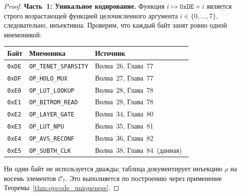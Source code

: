 \begin{proof}

\medskip
\noindent\textbf{Часть~1: Уникальное кодирование.}
Функция $i \mapsto \mathtt{0xDE} + i$ является строго возрастающей
функцией целочисленного аргумента $i \in \{0, \ldots, 7\}$,
следовательно, инъективна.  Проверим, что каждый байт занят
ровно одной мнемоникой:

\begin{center}
\begin{tabular}{lll}
\hline
Байт & Мнемоника & Источник \\
\hline
\texttt{0xDE} & \texttt{OP\_TENET\_SPARSITY}  & Волна~26, Глава~77 \\
\texttt{0xDF} & \texttt{OP\_HOLO\_MUX}         & Волна~27, Глава~77 \\
\texttt{0xE0} & \texttt{OP\_LUT\_LOOKUP}        & Волна~28, Глава~78 \\
\texttt{0xE1} & \texttt{OP\_BITROM\_READ}       & Волна~28, Глава~78 \\
\texttt{0xE2} & \texttt{OP\_LAYER\_GATE}        & Волна~34, Глава~80 \\
\texttt{0xE3} & \texttt{OP\_LUT\_NPU}           & Волна~35, Глава~81 \\
\texttt{0xE4} & \texttt{OP\_AVS\_RECONF}        & Волна~36, Глава~82~\cite{pr655_t27} \\
\texttt{0xE5} & \texttt{OP\_SUBTH\_CLK}         & Волна~38, Глава~84~(данная)~\cite{pr661_t27} \\
\hline
\end{tabular}
\end{center}

Ни один байт не используется дважды; таблица документирует
инъекцию $\rho$ на восемь элементов $\mathcal{C}_7$.
Это выполняется по построению через применение
Теоремы~\ref{thm:opcode_uniqueness}.


\end{proof}

